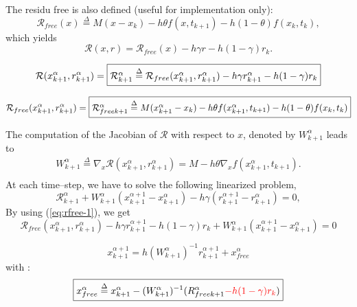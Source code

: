 The residu free is also defined (useful for implementation only):
\[\mathcal R _{free}(x) \stackrel{\Delta}{=}  M(x - x_{k}) -h\theta f( x , t_{k+1}) - h(1-\theta)f(x_k,t_k),\]
which yields
\[\mathcal R (x,r) = \mathcal R _{free}(x)   - h\gamma r - h(1-\gamma)r_k.\]

\begin{equation}
  \mathcal R (x^{\alpha}_{k+1},r^{\alpha}_{k+1}) = \fbox{$\mathcal R^{\alpha}_{k+1} \stackrel{\Delta}{=}  \mathcal R
_{free}(x^{\alpha}_{k+1},r^{\alpha}_{k+1} )  - h\gamma r^{\alpha}_{k+1} - h(1-\gamma)r_k$}\label{eq:rfree-1}
\end{equation}

\[  \mathcal R
_{free}(x^{\alpha}_{k+1},r^{\alpha}_{k+1} )=\fbox{$ \mathcal R _{free k+1} ^{\alpha} \stackrel{\Delta}{=}  M(x^{\alpha}_{k+1} - x_{k}) -h\theta f( x^{\alpha}_{k+1} , t_{k+1}) - h(1-\theta)f(x_k,t_k)$}\]
 
The computation of the Jacobian of $\mathcal R$ with respect to $x$, denoted by $   W^{\alpha}_{k+1}$ leads to 
\begin{equation}
   \label{eq:NL9}
   \begin{array}{l}
    W^{\alpha}_{k+1} \stackrel{\Delta}{=} \nabla_{x} \mathcal R (x^{\alpha}_{k+1},r^{\alpha}_{k+1})= M - h  \theta \nabla_{x} f(  x^{\alpha}_{k+1}, t_{k+1} ).\\
 \end{array}
\end{equation}
At each time--step, we have to solve the following linearized problem,
\begin{equation}
   \label{eq:NL10}
    \mathcal R^{\alpha}_{k+1} + W^{\alpha}_{k+1} (x^{\alpha+1}_{k+1} -
    x^{\alpha}_{k+1}) - h \gamma (r^{\alpha+1}_{k+1} - r^{\alpha}_{k+1} )  =0 ,
\end{equation}
By using (\ref{eq:rfree-1}), we get
\begin{equation}
  \label{eq:rfree-2}
  \mathcal R
_{free}(x^{\alpha}_{k+1},r^{\alpha}_{k+1} )  - h\gamma r^{\alpha+1}_{k+1} - h(1-\gamma)r_k  + W^{\alpha}_{k+1} (x^{\alpha+1}_{k+1} -
    x^{\alpha}_{k+1})  =0 
\end{equation}

{
  \begin{equation}
    \boxed{ x^{\alpha+1}_{k+1} = h(W^{\alpha}_{k+1})^{-1}r^{\alpha+1}_{k+1} +x^\alpha_{free}}
  \end{equation}
}
with :
\begin{equation}
  \boxed{x^\alpha_{free}\stackrel{\Delta}{=}x^{\alpha}_{k+1}-(W^{\alpha}_{k+1})^{-1}\mathcal (R_{freek+1}^{\alpha} \textcolor{red}{- h(1-\gamma) r_k})\label{eq:rfree-12}}
\end{equation}

